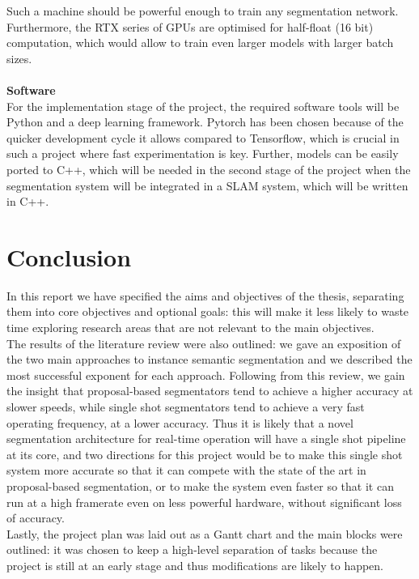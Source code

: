 \documentclass[12pt,twoside]{report}
\begin{document}
Such a machine should be powerful enough to train any segmentation network. Furthermore, the RTX series of GPUs are optimised for half-float (16 bit) computation, which would allow to train even larger models with larger batch sizes.
\\
\\

\textbf{Software}
\\

For the implementation stage of the project, the required software tools will be Python and a deep learning framework. Pytorch has been chosen because of the quicker development cycle it allows compared to Tensorflow, which is crucial in such a project where fast experimentation is key. Further, models can be easily ported to C++, which will be needed in the second stage of the project when the segmentation system will be integrated in a SLAM system, which will be written in C++.

\chapter{Conclusion}

In this report we have specified the aims and objectives of the thesis, separating them into core objectives and optional goals: this will make it less likely to waste time exploring research areas that are not relevant to the main objectives.
\\

The results of the literature review were also outlined: we gave an exposition of the two main approaches to instance semantic segmentation and we described the most successful exponent for each approach. Following from this review, we gain the insight that proposal-based segmentators tend to achieve a higher accuracy at slower speeds, while single shot segmentators tend to achieve a very fast operating frequency, at a lower accuracy. Thus it is likely that a novel segmentation architecture for real-time operation will have a single shot pipeline at its core, and two directions for this project would be to make this single shot system more accurate so that it can compete with the state of the art in proposal-based segmentation, or to make the system even faster so that it can run at a high framerate even on less powerful hardware, without significant loss of accuracy.
\\

Lastly, the project plan was laid out as a Gantt chart and the main blocks were outlined: it was chosen to keep a high-level separation of tasks because the project is still at an early stage and thus modifications are likely to happen.


\clearpage
{}


\end{document}
